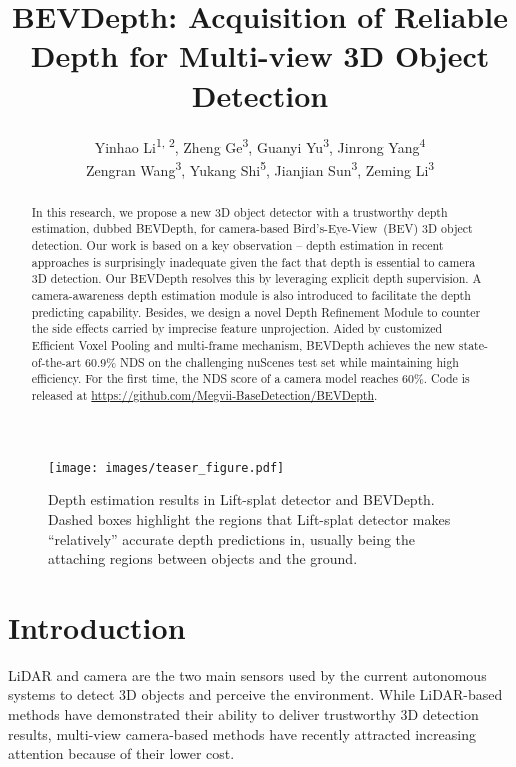 \documentclass[twocolumn,letterpaper]{article}
\title{BEVDepth: Acquisition of Reliable Depth for Multi-view 3D Object Detection}
\author{
    Yinhao Li\textsuperscript{\rm 1, \rm2},
    Zheng Ge\textsuperscript{\rm 3},
    Guanyi Yu\textsuperscript{\rm 3},
    Jinrong Yang\textsuperscript{\rm 4}\\
    Zengran Wang\textsuperscript{\rm 3},
    Yukang Shi\textsuperscript{\rm 5},
    Jianjian Sun\textsuperscript{\rm 3},
    Zeming Li\textsuperscript{\rm 3}
}
\begin{document}
\maketitle

\begin{abstract}

In this research, we propose a new 3D object detector with a trustworthy depth estimation,  dubbed BEVDepth, for camera-based Bird's-Eye-View~(BEV) 3D object detection. Our work is based on a key observation -- depth estimation in recent approaches is surprisingly inadequate given the fact that depth is essential to camera 3D detection. Our BEVDepth resolves this by leveraging explicit depth supervision. A camera-awareness depth estimation module is also introduced to facilitate the depth predicting capability. Besides, we design a novel Depth Refinement Module to counter the side effects carried by imprecise feature unprojection. Aided by customized Efficient Voxel Pooling and multi-frame mechanism, BEVDepth achieves the new state-of-the-art 60.9\% NDS on the challenging nuScenes test set while maintaining high efficiency. For the first time, the NDS score of a camera model reaches 60\%. Code is released at \href{https://github.com/Megvii-BaseDetection/BEVDepth}{https://github.com/Megvii-BaseDetection/BEVDepth}.

\end{abstract}

\begin{figure*}[!t]
\centering
\texttt{[image: images/teaser\_figure.pdf]}
\caption{Depth estimation results in Lift-splat detector and BEVDepth. Dashed boxes highlight the regions that Lift-splat detector makes ``relatively'' accurate depth predictions in, usually being the attaching regions between objects and the ground.}\label{teaser}
\end{figure*}

\section{Introduction} \label{sec:intro}

LiDAR and camera are the two main sensors used by the current autonomous systems to detect 3D objects and perceive the environment. While LiDAR-based methods have demonstrated their ability to deliver trustworthy 3D detection results, multi-view camera-based methods have recently attracted increasing attention because of their lower cost.
\end{document}
